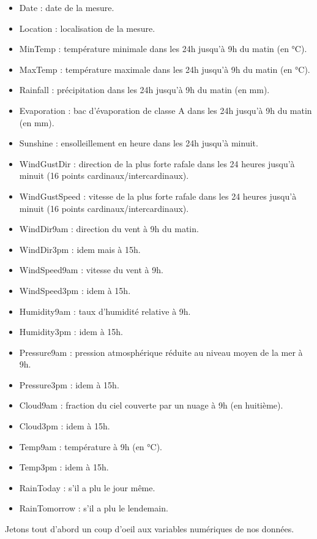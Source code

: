 \documentclass{article}
\begin{document}
\begin{itemize}
    \item Date : date de la mesure.
    \item Location : localisation de la mesure.
    \item MinTemp : température minimale dans les 24h jusqu'à 9h du matin (en °C).
    \item MaxTemp : température maximale dans les 24h jusqu'à 9h du matin (en °C).
    \item Rainfall : précipitation dans les 24h jusqu'à 9h du matin (en mm).
    \item Evaporation : bac d'évaporation de classe A dans les 24h jusqu'à 9h du matin (en mm).
    \item Sunshine : ensolleillement en heure dans les 24h jusqu'à minuit.
    \item WindGustDir : direction de la plus forte rafale dans les 24 heures jusqu'à minuit (16 points cardinaux/intercardinaux).   
    \item WindGustSpeed : vitesse de la plus forte rafale dans les 24 heures jusqu'à minuit (16 points cardinaux/intercardinaux).
    \item WindDir9am : direction du vent à 9h du matin.
    \item WindDir3pm : idem mais à 15h.
    \item WindSpeed9am : vitesse du vent à 9h.
    \item WindSpeed3pm : idem à 15h.
    \item Humidity9am : taux d'humidité relative à 9h.
    \item Humidity3pm : idem à 15h.
    \item Pressure9am : pression atmosphérique réduite au niveau moyen de la mer à 9h.
    \item Pressure3pm : idem à 15h.
    \item Cloud9am : fraction du ciel couverte par un nuage à 9h (en huitième).   
    \item Cloud3pm : idem à 15h.
    \item Temp9am : température à 9h (en °C).
    \item Temp3pm : idem à 15h.
    \item RainToday : s'il a plu le jour même.
    \item RainTomorrow : s'il a plu le lendemain.   
\end{itemize}

Jetons tout d'abord un coup d'oeil aux variables numériques de nos données. 
\end{document}
